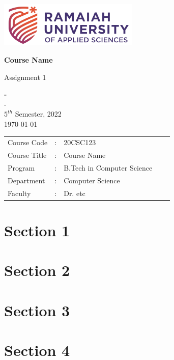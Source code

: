 \documentclass[12pt]{article}
\newcommand{\Course}{Course Name}
\newcommand{\Name}{-}
\newcommand{\Regno}{-}
\newcommand{\Batch}{$5^{th}$ Semester, 2022}
\newcommand{\Date}{\today}
\newcommand{\Courseno}{20CSC123}
\newcommand{\Program}{B.Tech in Computer Science}
\newcommand{\Department}{Computer Science}
\newcommand{\Faculty}{Dr. etc}
\begin{document}
\onehalfspacing
\begin{titlepage}

  \begin{center}
    \vspace*{\fill}
    \includegraphics[width=0.5\textwidth]{images/school logo.png}
    \vspace{1cm}

    \Huge
    \textbf{\Course}

    \vspace{0.5cm}
    \LARGE
    Assignment 1

    \vspace{1cm}

    \textbf{\Name}
    \vspace{0.5cm}\\
    \Large
    \Regno\\
    \Batch\\
    \Date
    \vspace{1.5cm}

  \end{center}
  \begin{center}
    \Large
    \begin{tabular}{ l l l l l }
      Course Code  & : & \Courseno   \\
      Course Title & : & \Course     \\
      Program      & : & \Program    \\
      Department   & : & \Department \\
      Faculty      & : & \Faculty
    \end{tabular}
  \end{center}
  \vspace*{\fill}
\end{titlepage}

% 
% 

\tableofcontents
\newpage

\section{Section 1}

\newpage

\section{Section 2}

\newpage

\section{Section 3}

\newpage

\section{Section 4}


% 
% 
\end{document}
